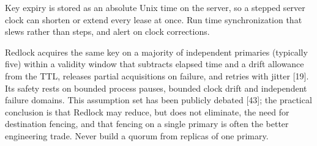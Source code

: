 Key expiry is stored as an absolute Unix time on the server, so a stepped server clock can shorten or extend every lease at once. Run time synchronization that slews rather than steps, and alert on clock corrections.

Redlock acquires the same key on a majority of independent primaries (typically five) within a validity window that subtracts elapsed time and a drift allowance from the TTL, releases partial acquisitions on failure, and retries with jitter [19]. Its safety rests on bounded process pauses, bounded clock drift and independent failure domains. This assumption set has been publicly debated [43]; the practical conclusion is that Redlock may reduce, but does not eliminate, the need for destination fencing, and that fencing on a single primary is often the better engineering trade. Never build a quorum from replicas of one primary.

